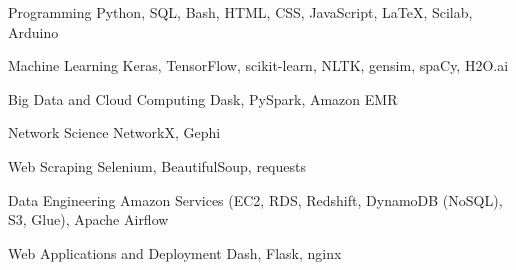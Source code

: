 

\begin{cvskills}

  \cvskill
    {Programming} %
    {Python, SQL, Bash, HTML, CSS, JavaScript, LaTeX, Scilab, Arduino} %


  \cvskill
    {Machine Learning} %
    {Keras, TensorFlow, scikit-learn, NLTK, gensim, spaCy, H2O.ai} %
    
  \cvskill
    {Big Data and Cloud Computing} %
    {Dask, PySpark, Amazon EMR} %
    
  \cvskill
    {Network Science} %
    {NetworkX, Gephi} %
    
  \cvskill
    {Web Scraping} %
    {Selenium, BeautifulSoup, requests} %
    
  \cvskill
    {Data Engineering} %
    {Amazon Services (EC2, RDS, Redshift, DynamoDB (NoSQL), S3, Glue), Apache Airflow} %
    
  \cvskill
    {Web Applications and Deployment} %
    {Dash, Flask, nginx} %

\end{cvskills}
